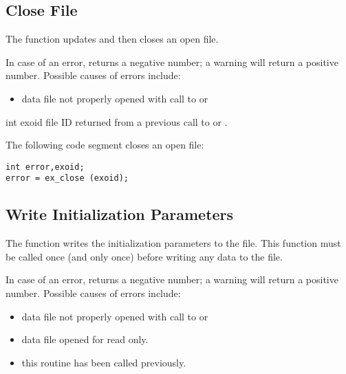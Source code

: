\subsection{Close \exo{} File}

The function  updates and
then closes an open \exo{} file.

In case of an error,  returns a negative number; a
warning will return a positive number. Possible causes of errors
include:
\begin{itemize}
 \item data file not properly opened with call to  or
\end{itemize}



\begin{parameters}
\item[{int exoid \R{}}]
\exo{} file ID returned from a previous call to 
or .
\end{parameters}

The following code segment closes an open \exo{} file:

\begin{lstlisting}
int error,exoid;
error = ex_close (exoid);
\end{lstlisting}



\subsection{Write Initialization Parameters}

The function  writes the
initialization parameters to the \exo{}
file. This function must be called once (and only once) before
writing any data to the file.


In case of an error,  returns a negative number;
a warning will return a positive number.  Possible causes of errors
include:

\begin{itemize}
 \item data file not properly opened with call to  or

 \item data file opened for read only.

 \item this routine has been called previously.
\end{itemize}



